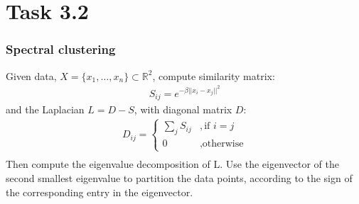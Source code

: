 \documentclass{beamer}
\begin{document}
\section{Task 3.2}
\begin{frame}
	\frametitle{Spectral clustering}
	Given data, $X = \{x_1,\ldots,x_n\} \subset \mathbb{R}^2$, compute similarity matrix:
	\begin{align*}
		S_{ij} = e^{-\beta ||x_i-x_j||^2}
	\end{align*}
	and the Laplacian $L = D-S$, with diagonal matrix $D$:
	\begin{align*}
	D_{ij} = \begin{cases}
	\sum_j S_{ij} & ,\text{if } i=j\\
	0 &, \text{otherwise}
	\end{cases}\\
	\end{align*}
	Then compute the eigenvalue decomposition of L. Use the eigenvector of the second smallest eigenvalue to partition the data points, according to the sign of the corresponding entry in the eigenvector.
\end{frame}
\end{document}
